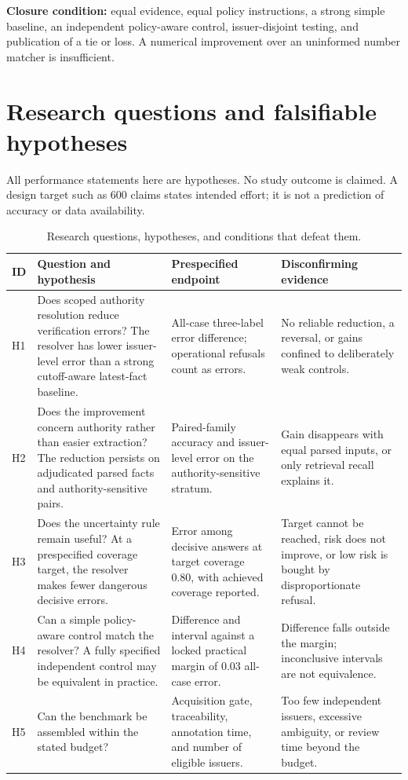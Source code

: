 \documentclass[11pt,a4paper]{article}
\newcommand{\pbreak}{\clearpage}
\newcommand{\lead}[1]{\textbf{\color{navy}#1}}
\newcommand{\status}[1]{\textsf{\color{teal}#1}}
\begin{document}
\lead{Closure condition:} equal evidence, equal policy instructions, a strong simple baseline, an independent policy-aware control, issuer-disjoint testing, and publication of a tie or loss. A numerical improvement over an uninformed number matcher is insufficient.

\pbreak
\section{Research questions and falsifiable hypotheses}
All performance statements here are \status{hypotheses}. No study outcome is claimed. A design target such as 600 claims states intended effort; it is not a prediction of accuracy or data availability.

\begin{table}[H]\caption{Research questions, hypotheses, and conditions that defeat them.}
\small\begin{tabularx}{\linewidth}{p{.08\linewidth}YYY}\toprule
ID & Question and hypothesis & Prespecified endpoint & Disconfirming evidence\\\midrule
H1 & Does scoped authority resolution reduce verification errors? The resolver has lower issuer-level error than a strong cutoff-aware latest-fact baseline. & All-case three-label error difference; operational refusals count as errors. & No reliable reduction, a reversal, or gains confined to deliberately weak controls.\\
H2 & Does the improvement concern authority rather than easier extraction? The reduction persists on adjudicated parsed facts and authority-sensitive pairs. & Paired-family accuracy and issuer-level error on the authority-sensitive stratum. & Gain disappears with equal parsed inputs, or only retrieval recall explains it.\\
H3 & Does the uncertainty rule remain useful? At a prespecified coverage target, the resolver makes fewer dangerous decisive errors. & Error among decisive answers at target coverage 0.80, with achieved coverage reported. & Target cannot be reached, risk does not improve, or low risk is bought by disproportionate refusal.\\
H4 & Can a simple policy-aware control match the resolver? A fully specified independent control may be equivalent in practice. & Difference and interval against a locked practical margin of 0.03 all-case error. & Difference falls outside the margin; inconclusive intervals are not equivalence.\\
H5 & Can the benchmark be assembled within the stated budget? & Acquisition gate, traceability, annotation time, and number of eligible issuers. & Too few independent issuers, excessive ambiguity, or review time beyond the budget.\\\bottomrule
\end{tabularx}\end{table}
\end{document}
